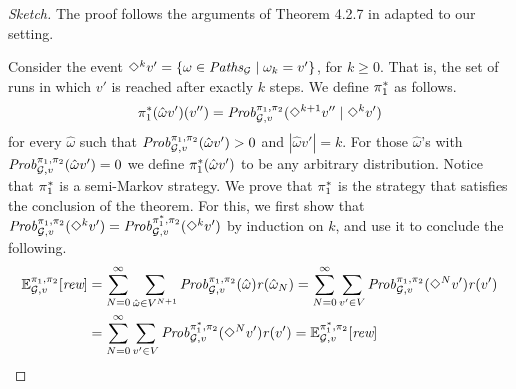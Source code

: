 \begin{proof}[Sketch]
  The proof follows the arguments of Theorem 4.2.7 in \cite{FilarV96}
  adapted to our setting.
	
  Consider the event $\Diamond^{k} v' = \{ \omega \in
  \mathit{Paths}_{\mathcal{G}} \mid \omega_k = v'\}$, for $k\geq 0$. That is,
  the set of runs in which $v'$ is reached after exactly $k$ steps.
  We define $\pi^*_{1}$ as follows.
  \[
  \pi^*_{1}(\hat{\omega}v')(v'') =  \mathit{Prob}^{\pi_{1}, \pi_{2}}_{\mathcal{G},v}(\Diamond^{k+1} v'' \mid \Diamond^k v') 
  \]
  for every $\hat{\omega}$ such that $\mathit{Prob}^{\pi_{1}, \pi_{2}}_{\mathcal{G},v}(\hat{\omega}v') > 0$ and $|\hat{\omega}v'| = k$.  For those $\hat{\omega}$'s with $\mathit{Prob}^{\pi_{1}, \pi_{2}}_{\mathcal{G},v}(\hat{\omega}v') = 0$ we define $\pi^*_{1}(\hat{\omega}v')$ to be any arbitrary distribution.
  Notice that $\pi^*_{1}$ is a semi-Markov strategy.
  We prove that $\pi^*_{1}$ is the strategy that satisfies the
  conclusion of the theorem.
  For this, we first show that $\mathit{Prob}^{\pi_{1}, \pi_{2}}_{\mathcal{G},v}(\Diamond^{k} v') = \mathit{Prob}^{\pi^*_{1}, \pi_{2}}_{\mathcal{G},v}(\Diamond^{k} v')$ by induction on $k$, and use it to conclude the following. 
  \begin{align*}
  \mathbb{E}^{\pi_{1}, \pi_{2}}_{\mathcal{G},v}[\textit{rew}]   &  = \sum^\infty_{N=0} \sum_{\hat{\omega} \in V^{N+1}} \mathit{Prob}^{\pi_{1}, \pi_{2}}_{\mathcal{G},v}(\hat{\omega})\mathit{r}(\hat{\omega}_N)
   = \sum^\infty_{N=0} \sum_{v' \in V} \mathit{Prob}^{\pi_{1}, \pi_{2}}_{\mathcal{G},v}(\Diamond^N v')\mathit{r}(v') \\
  & =  \sum^\infty_{N=0} \sum_{v' \in V} \mathit{Prob}^{\pi^*_{1}, \pi_{2}}_{\mathcal{G},v}(\Diamond^N v')\mathit{r}(v') 
   = \mathbb{E}^{\pi^*_{1}, \pi_{2}}_{\mathcal{G},v}[\textit{rew}] \tag*{\qedhere}
  \end{align*}

\end{proof}
